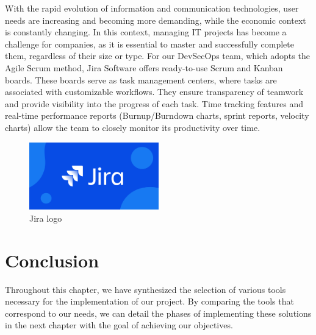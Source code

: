 With the rapid evolution of information and communication technologies, user needs are increasing and becoming more demanding, while the economic context is constantly changing. In this context, managing IT projects has become a challenge for companies, as it is essential to master and successfully complete them, regardless of their size or type. For our DevSecOps team, which adopts the Agile Scrum method, Jira Software offers ready-to-use Scrum and Kanban boards. These boards serve as task management centers, where tasks are associated with customizable workflows. They ensure transparency of teamwork and provide visibility into the progress of each task. Time tracking features and real-time performance reports (Burnup/Burndown charts, sprint reports, velocity charts) allow the team to closely monitor its productivity over time.

\begin{figure}[h]
    \centering
    \includegraphics[width=0.5\textwidth]{Logos/jira-png.png}
    \caption{Jira logo}
\end{figure}

\section{Conclusion}

Throughout this chapter, we have synthesized the selection of various tools necessary for the implementation of our project. By comparing the tools that correspond to our needs, we can detail the phases of implementing these solutions in the next chapter with the goal of achieving our objectives.

\pagebreak